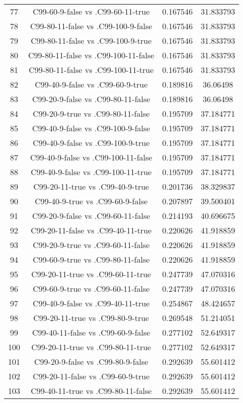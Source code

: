 \documentclass[a4paper,10pt]{article}
\begin{document}
\begin{landscape}
\begin{table}[!htp]
\begin{tabular}{cccc}
77&C99-60-9-false vs .C99-60-11-true&0.167546&31.833793\\
78&C99-80-11-false vs .C99-100-9-false&0.167546&31.833793\\
79&C99-80-11-false vs .C99-100-9-true&0.167546&31.833793\\
80&C99-80-11-false vs .C99-100-11-false&0.167546&31.833793\\
81&C99-80-11-false vs .C99-100-11-true&0.167546&31.833793\\
82&C99-40-9-false vs .C99-60-9-true&0.189816&36.06498\\
83&C99-20-9-false vs .C99-80-11-false&0.189816&36.06498\\
84&C99-20-9-true vs .C99-80-11-false&0.195709&37.184771\\
85&C99-40-9-false vs .C99-100-9-false&0.195709&37.184771\\
86&C99-40-9-false vs .C99-100-9-true&0.195709&37.184771\\
87&C99-40-9-false vs .C99-100-11-false&0.195709&37.184771\\
88&C99-40-9-false vs .C99-100-11-true&0.195709&37.184771\\
89&C99-20-11-true vs .C99-40-9-true&0.201736&38.329837\\
90&C99-40-9-true vs .C99-60-9-false&0.207897&39.500401\\
91&C99-20-9-false vs .C99-60-11-false&0.214193&40.696675\\
92&C99-20-11-false vs .C99-40-11-true&0.220626&41.918859\\
93&C99-20-9-true vs .C99-60-11-false&0.220626&41.918859\\
94&C99-60-9-true vs .C99-80-11-false&0.220626&41.918859\\
95&C99-20-11-true vs .C99-60-11-true&0.247739&47.070316\\
96&C99-60-9-true vs .C99-60-11-false&0.247739&47.070316\\
97&C99-40-9-false vs .C99-40-11-true&0.254867&48.424657\\
98&C99-20-11-true vs .C99-80-9-true&0.269548&51.214051\\
99&C99-40-11-false vs .C99-60-9-false&0.277102&52.649317\\
100&C99-20-11-true vs .C99-80-11-true&0.277102&52.649317\\
101&C99-20-9-false vs .C99-80-9-false&0.292639&55.601412\\
102&C99-20-11-false vs .C99-60-9-true&0.292639&55.601412\\
103&C99-40-11-true vs .C99-80-11-false&0.292639&55.601412\\

\end{tabular}
\end{table}
\end{landscape}
\end{document}
